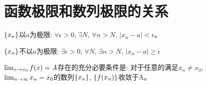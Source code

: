 \documentclass[lang=cn]{elegantbook}
\begin{document}
\section{函数极限和数列极限的关系}
\begin{theorem}[否定命题的分析表示]
    $\left\{ x_n\right\}$以$a$为极限: $\forall \epsilon > 0$, $\exists N$, $\forall n > N$, $\left| x_n - a \right| < \epsilon$。

    $\left\{ x_n\right\}$不以$a$为极限: $\exists \epsilon > 0$, $\forall N$, $\exists n > N$, $\left| x_n - a \right| \ge \epsilon$
\end{theorem}
\begin{theorem}[heine定理]
    $\lim_{x \to x_0 } f(x) = A$存在的充分必要条件是: 对于任意的满足$x_n \neq x_0$, $\lim_{n \to \infty } x_n = x_0$的数列$\left\{ x_n\right\}$, $\left\{ f(x_n)\right\}$收敛于A。
\end{theorem}
\end{document}
